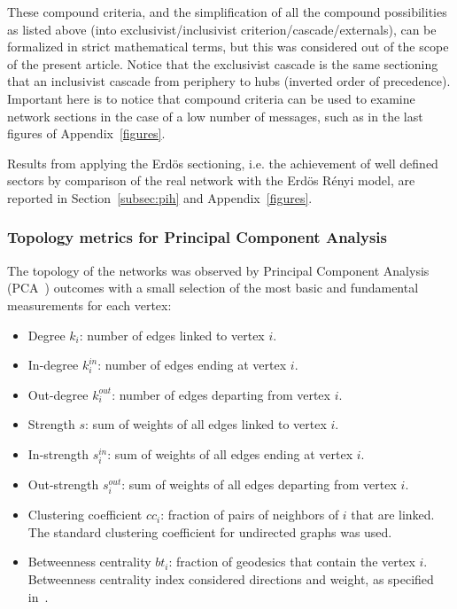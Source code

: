 \documentclass[%
 aip,
 jmp,%
 amsmath,amssymb,
 reprint,%
]{revtex4-1}
\begin{document}
These compound criteria, and the simplification of all the compound possibilities as listed above (into exclusivist/inclusivist criterion/cascade/externals), can be formalized in strict mathematical terms, but this was considered out of the scope of the present article. Notice that the exclusivist cascade is the same sectioning that an inclusivist cascade from periphery to hubs (inverted order of precedence). Important here is to notice that compound criteria can be used to examine network sections in the case of a low number of messages, such as in the last figures of Appendix~\ref{figures}.

Results from applying the Erd\"os sectioning, i.e. the achievement of well defined sectors by comparison of the real network with the Erd\"os R\'enyi model, are reported in Section~\ref{subsec:pih} and Appendix~\ref{figures}.

\subsubsection{Topology metrics for Principal Component Analysis}\label{measures}

The topology of the networks was observed by Principal Component Analysis (PCA~\cite{pca}) outcomes
with a small selection of the most basic and fundamental measurements for each vertex:

\begin{itemize}
    \item Degree     $k_i$: number of edges linked to vertex $i$.
    \item In-degree  $k_i^{in}$: number of edges ending at vertex $i$.
    \item Out-degree $k_i^{out}$: number of edges departing from vertex $i$.
    \item Strength $s$: sum of weights of all edges linked to vertex $i$.
    \item In-strength $s_i^{in}$: sum of weights of all edges ending at vertex $i$.
    \item Out-strength $s_i^{out}$: sum of weights of all edges departing from vertex $i$.
    \item Clustering coefficient $cc_i$: fraction of pairs of neighbors of $i$ that are linked.  The standard clustering coefficient for undirected graphs was used.
    \item Betweenness centrality $bt_i$: fraction of geodesics that contain the vertex $i$. Betweenness centrality index considered directions and weight, as specified in~\cite{faster}.
\end{itemize}
\end{document}
